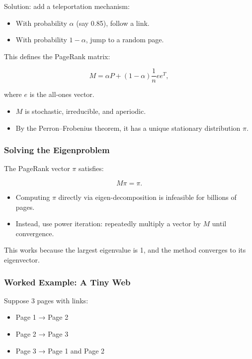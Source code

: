 \documentclass[
  letterpaper,
  DIV=11,
  numbers=noendperiod]{scrreprt}
\providecommand{\tightlist}{%
  \setlength{\itemsep}{0pt}\setlength{\parskip}{0pt}}
\begin{document}
Solution: add a teleportation mechanism:

\begin{itemize}
\tightlist
\item
  With probability \(\alpha\) (say 0.85), follow a link.
\item
  With probability \(1-\alpha\), jump to a random page.
\end{itemize}

This defines the PageRank matrix:

\[
M = \alpha P + (1-\alpha)\frac{1}{n} ee^T,
\]

where \(e\) is the all-ones vector.

\begin{itemize}
\tightlist
\item
  \(M\) is stochastic, irreducible, and aperiodic.
\item
  By the Perron--Frobenius theorem, it has a unique stationary
  distribution \(\pi\).
\end{itemize}

\subsubsection{Solving the Eigenproblem}\label{solving-the-eigenproblem}

The PageRank vector \(\pi\) satisfies:

\[
M \pi = \pi.
\]

\begin{itemize}
\tightlist
\item
  Computing \(\pi\) directly via eigen-decomposition is infeasible for
  billions of pages.
\item
  Instead, use power iteration: repeatedly multiply a vector by \(M\)
  until convergence.
\end{itemize}

This works because the largest eigenvalue is 1, and the method converges
to its eigenvector.

\subsubsection{Worked Example: A Tiny
Web}\label{worked-example-a-tiny-web}

Suppose 3 pages with links:

\begin{itemize}
\tightlist
\item
  Page 1 → Page 2
\item
  Page 2 → Page 3
\item
  Page 3 → Page 1 and Page 2
\end{itemize}
\end{document}
